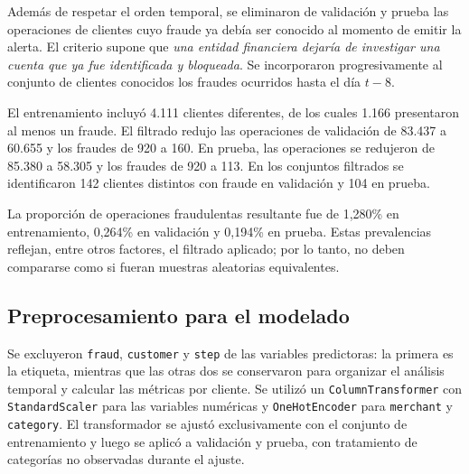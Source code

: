 Además de respetar el orden temporal, se eliminaron de validación y prueba las operaciones de clientes cuyo fraude ya debía ser conocido al momento de emitir la alerta. El criterio supone que \textit{una entidad financiera dejaría de investigar una cuenta que ya fue identificada y bloqueada}. Se incorporaron progresivamente al conjunto de clientes conocidos los fraudes ocurridos hasta el día $t-8$.

El entrenamiento incluyó 4.111 clientes diferentes, de los cuales 1.166 presentaron al menos un fraude. El filtrado redujo las operaciones de validación de 83.437 a 60.655 y los fraudes de 920 a 160. En prueba, las operaciones se redujeron de 85.380 a 58.305 y los fraudes de 920 a 113. En los conjuntos filtrados se identificaron 142 clientes distintos con fraude en validación y 104 en prueba.

La proporción de operaciones fraudulentas resultante fue de 1,280\% en entrenamiento, 0,264\% en validación y 0,194\% en prueba. Estas prevalencias reflejan, entre otros factores, el filtrado aplicado; por lo tanto, no deben compararse como si fueran muestras aleatorias equivalentes.

\subsection{Preprocesamiento para el modelado}
Se excluyeron \texttt{fraud}, \texttt{customer} y \texttt{step} de las variables predictoras: la primera es la etiqueta, mientras que las otras dos se conservaron para organizar el análisis temporal y calcular las métricas por cliente. Se utilizó un \texttt{ColumnTransformer} con \texttt{StandardScaler} para las variables numéricas y \texttt{OneHotEncoder} para \texttt{merchant} y \texttt{category}. El transformador se ajustó exclusivamente con el conjunto de entrenamiento y luego se aplicó a validación y prueba, con tratamiento de categorías no observadas durante el ajuste.